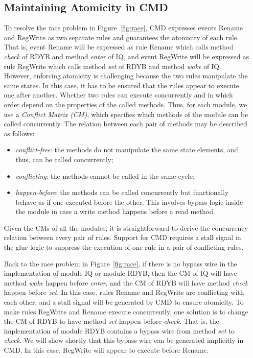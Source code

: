 \documentclass[conference]{IEEEtran}
\begin{document}
\subsection{Maintaining Atomicity in CMD}
To resolve the race problem in Figure~\ref{fig:race}, CMD expresses events Rename and RegWrite as two separate rules and guarantees the atomicity of each rule.
That is, event Rename will be expressed as rule Rename which calls method \emph{check} of RDYB and method \emph{enter} of IQ, and event RegWrite will be expressed as rule RegWrite which calls method \emph{set} of RDYB and method \emph{wake} of IQ.
However, enforcing atomicity is challenging because the two rules manipulate the same states.
In this case, it has to be ensured that the rules appear to execute one after another.
Whether two rules can execute concurrently and in which order depend on the properties of the called methods.
Thus, for each module, we use a \emph{Conflict Matrix (CM)}, which specifies which methods of the module can be called concurrently.
The relation between each pair of methods may be described as follows:
\begin{itemize}
    \item \emph{conflict-free}: the methods do not manipulate the same state elements, and thus, can be called concurrently;
    \item \emph{conflicting}: the methods cannot be called in the same cycle;
    \item \emph{happen-before}: the methods can be called concurrently but functionally behave as if one executed before the other.
    This involves bypass logic inside the module in case a write method happens before a read method.
\end{itemize}
Given the CMs of all the modules, it is straightforward to derive the concurrency relation between every pair of rules.
Support for CMD requires a stall signal in the glue logic to suppress the execution of one rule in a pair of conflicting rules.

Back to the race problem in Figure~\ref{fig:race}, if there is no bypass wire in the implementation of module IQ or module RDYB, then the CM of IQ will have method \emph{wake} happen before \emph{enter}, and the CM of RDYB will have method \emph{check} happen before \emph{set}.
In this case, rules Rename and RegWrite are conflicting with each other, and a stall signal will be generated by CMD to ensure atomicity.
To make rules RegWrite and Rename execute concurrently, one solution is to change the CM of RDYB to have method \emph{set} happen before \emph{check}.
That is, the implementation of module RDYB contains a bypass wire from method \emph{set} to \emph{check}.
We will show shortly that this bypass wire can be generated implicitly in CMD.
In this case, RegWrite will appear to execute before Rename.
\end{document}
